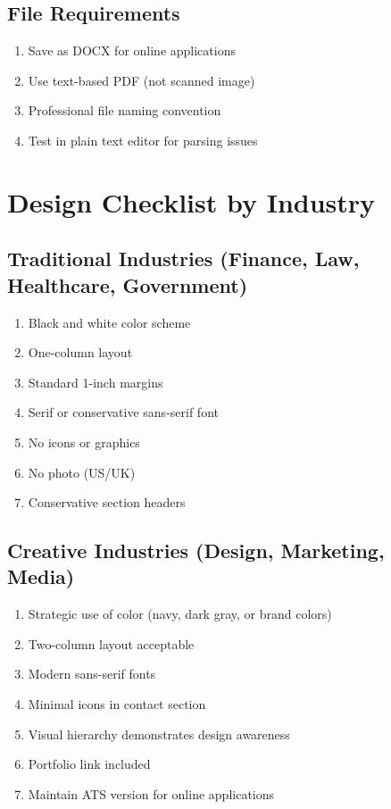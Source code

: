 \documentclass[11pt,a4paper]{article}
\begin{document}
\subsection{File Requirements}

\begin{enumerate}
    \item[$\square$] Save as DOCX for online applications
    \item[$\square$] Use text-based PDF (not scanned image)
    \item[$\square$] Professional file naming convention
    \item[$\square$] Test in plain text editor for parsing issues
\end{enumerate}

\section{Design Checklist by Industry}

\subsection{Traditional Industries (Finance, Law, Healthcare, Government)}

\begin{enumerate}
    \item[$\square$] Black and white color scheme
    \item[$\square$] One-column layout
    \item[$\square$] Standard 1-inch margins
    \item[$\square$] Serif or conservative sans-serif font
    \item[$\square$] No icons or graphics
    \item[$\square$] No photo (US/UK)
    \item[$\square$] Conservative section headers
\end{enumerate}

\subsection{Creative Industries (Design, Marketing, Media)}

\begin{enumerate}
    \item[$\square$] Strategic use of color (navy, dark gray, or brand colors)
    \item[$\square$] Two-column layout acceptable
    \item[$\square$] Modern sans-serif fonts
    \item[$\square$] Minimal icons in contact section
    \item[$\square$] Visual hierarchy demonstrates design awareness
    \item[$\square$] Portfolio link included
    \item[$\square$] Maintain ATS version for online applications
\end{enumerate}
\end{document}
